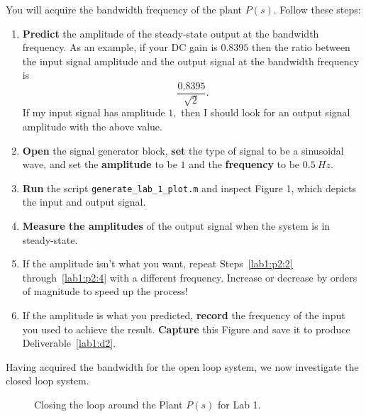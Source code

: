 \begin{procedure}[label={proc:lab1:p2}]
  You will acquire the bandwidth frequency of the plant \(P(s)\).
  Follow these steps:
  \begin{enumerate}[label=(\arabic*)]
    \item{
      \textbf{Predict} the amplitude of the steady-state output at the
      bandwidth frequency. As an example, if your DC gain is \(0.8395\) then
      the ratio between the input signal amplitude and the output signal
      at the bandwidth frequency is
      \[
        \frac{0.8395}{\sqrt{2}}.
      \]
      If my input signal has amplitude \(1,\) then I should look for
      an output signal amplitude with the above value.
    }
    \item{
      \label{lab1:p2:2}
      \textbf{Open} the signal generator block, \textbf{set} the type of signal
      to be a sinusoidal wave, and set the
      \textbf{amplitude} to be \(1\) and
      the \textbf{frequency} to be \(\SI{0.5}{Hz}.\)
    }
    \item{
      \textbf{Run} the script \texttt{generate\_lab\_1\_plot.m} and inspect
      Figure 1, which depicts the input and output signal.
    }
    \item{
      \label{lab1:p2:4}
      \textbf{Measure the amplitudes} of the output signal
      when the system is in steady-state.
    }
    \item{
      If the amplitude isn't what you want, repeat Steps~\ref{lab1:p2:2} through~\ref{lab1:p2:4} with a different frequency. Increase or decrease
      by orders of magnitude to speed up the process!
    }
    \item{
      If the amplitude is what you predicted, \textbf{record} the frequency
      of the input you used to achieve the result.
      \textbf{Capture} this Figure and save it to produce Deliverable~\ref{lab1:d2}.
    }
  \end{enumerate}
\end{procedure}
%
Having acquired the bandwidth for the open loop system, we now investigate
the closed loop system.
%
\begin{figure}
  \centering
  \caption[Closed-Loop Diagram for Lab 1]{
    Closing the loop around the Plant \(P(s)\) for Lab 1.
  }
  \label{fig:lab1:closing-loop}
\end{figure}
